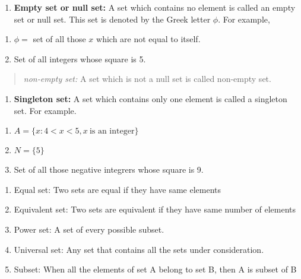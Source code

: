 \documentclass[
]{book}
\providecommand{\tightlist}{%
  \setlength{\itemsep}{0pt}\setlength{\parskip}{0pt}}
\theoremstyle{definition}
\theoremstyle{definition}
\theoremstyle{definition}
\theoremstyle{definition}
\theoremstyle{remark}
\begin{document}
\begin{enumerate}
\def\labelenumi{\arabic{enumi}.}
\setcounter{enumi}{2}
\tightlist
\item
  \textbf{Empty set or null set:} A set which contains no element is called an empty set or null set. This set is denoted by the Greek letter \(\phi\). For example,
\end{enumerate}

\begin{enumerate}
\def\labelenumi{\alph{enumi}.}
\item
  \(\phi=\) set of all those \(x\) which are not equal to itself.
\item
  Set of all integers whose square is 5.
\end{enumerate}

\begin{quote}
\emph{non-empty set:} A set which is not a null set is called non-empty set.
\end{quote}

\begin{enumerate}
\def\labelenumi{\arabic{enumi}.}
\setcounter{enumi}{3}
\tightlist
\item
  \textbf{Singleton set:} A set which contains only one element is called a singleton set. For example.
\end{enumerate}

\begin{enumerate}
\def\labelenumi{\alph{enumi}.}
\item
  \(A=\{x: 4<x<5, x~\text{is an integer}\}\)
\item
  \(N=\{5\}\)
\item
  Set of all those negative integrers whose square is 9.
\end{enumerate}

\begin{enumerate}
\def\labelenumi{\arabic{enumi}.}
\setcounter{enumi}{4}
\tightlist
\item
  Equal set: Two sets are equal if they have same elements
\item
  Equivalent set: Two sets are equivalent if they have same number of elements
\item
  Power set: A set of every possible subset.
\item
  Universal set: Any set that contains all the sets under consideration.
\item
  Subset: When all the elements of set A belong to set B, then A is subset of B
\end{enumerate}
\end{document}
